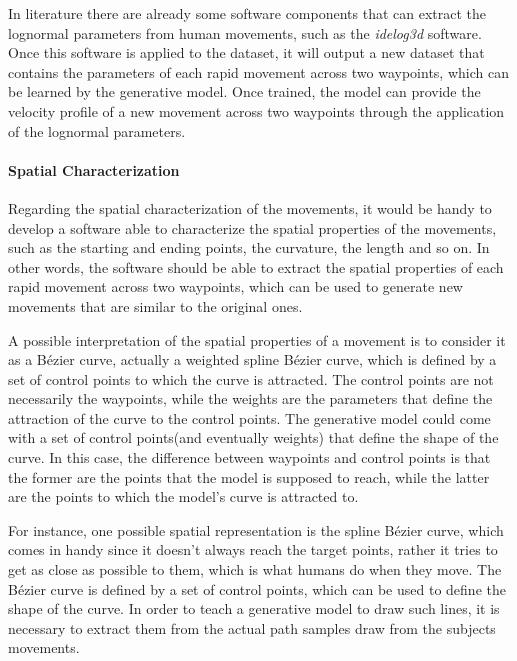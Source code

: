 \documentclass[12pt]{report}
\begin{document}
In literature there are already some software components that can extract the lognormal parameters from human movements, such as the \textit{idelog3d} software. Once this software is applied to the dataset, it will output a new dataset that contains the parameters of each rapid movement across two waypoints, which can be learned by the generative model. Once trained, the model can provide the velocity profile of a new movement across two waypoints through the application of the lognormal parameters.

\paragraph{Spatial Characterization}
Regarding the spatial characterization of the movements, it would be handy to develop a software able to characterize the spatial properties of the movements, such as the starting and ending points, the curvature, the length and so on. In other words, the software should be able to extract the spatial properties of each rapid movement across two waypoints, which can be used to generate new movements that are similar to the original ones.

A possible interpretation of the spatial properties of a movement is to consider it as a Bézier curve, actually a weighted spline Bézier curve, which is defined by a set of control points to which the curve is attracted. The control points are not necessarily the waypoints, while the weights are the parameters that define the attraction of the curve to the control points. The generative model could come with a set of control points(and eventually weights) that define the shape of the curve. In this case, the difference between waypoints and control points is that the former are the points that the model is supposed to reach, while the latter are the points to which the model's curve is attracted to.

For instance, one possible spatial representation is the spline Bézier curve, which comes in handy since it doesn't always reach the target points, rather it tries to get as close as possible to them, which is what humans do when they move. The Bézier curve is defined by a set of control points, which can be used to define the shape of the curve. In order to teach a generative model to draw such lines, it is necessary to extract them from the actual path samples draw from the subjects movements.
\end{document}
